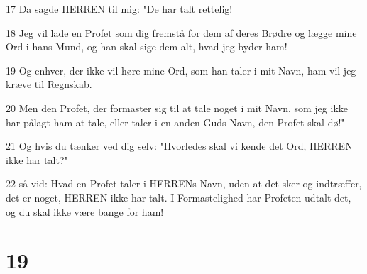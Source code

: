 \par 17 Da sagde HERREN til mig: "De har talt rettelig!
\par 18 Jeg vil lade en Profet som dig fremstå for dem af deres Brødre og lægge mine Ord i hans Mund, og han skal sige dem alt, hvad jeg byder ham!
\par 19 Og enhver, der ikke vil høre mine Ord, som han taler i mit Navn, ham vil jeg kræve til Regnskab.
\par 20 Men den Profet, der formaster sig til at tale noget i mit Navn, som jeg ikke har pålagt ham at tale, eller taler i en anden Guds Navn, den Profet skal dø!"
\par 21 Og hvis du tænker ved dig selv: "Hvorledes skal vi kende det Ord, HERREN ikke har talt?"
\par 22 så vid: Hvad en Profet taler i HERRENs Navn, uden at det sker og indtræffer, det er noget, HERREN ikke har talt. I Formastelighed har Profeten udtalt det, og du skal ikke være bange for ham!

\chapter{19}

